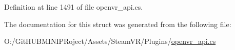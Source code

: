 Definition at line 1491 of file openvr\+\_\+api.\+cs.



The documentation for this struct was generated from the following file\+:\begin{DoxyCompactItemize}
\item 
O\+:/\+Git\+H\+U\+B\+M\+I\+N\+I\+P\+Roject/\+Assets/\+Steam\+V\+R/\+Plugins/\mbox{\hyperlink{openvr__api_8cs}{openvr\+\_\+api.\+cs}}\end{DoxyCompactItemize}
